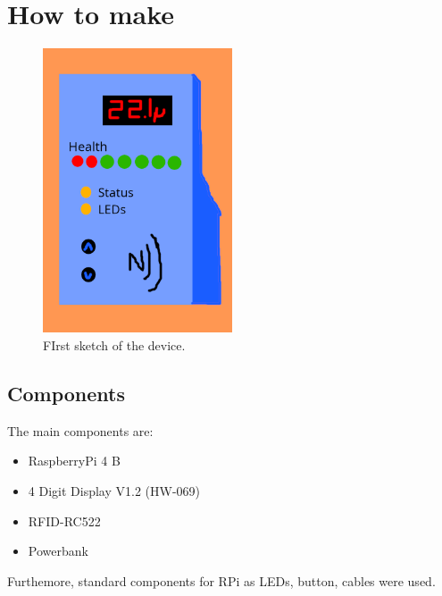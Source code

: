 \documentclass{article}
\begin{document}
\section{How to make}

\begin{figure}
    \centering
    \includegraphics[width=0.5\textwidth]{imgs/Sketch.png}
    \caption{FIrst sketch of the device.}
\end{figure}

\subsection{Components}
The main components are:
\begin{itemize}
    \item RaspberryPi 4 B
    \item 4 Digit Display V1.2 (HW-069) 
    \item RFID-RC522
    \item Powerbank
\end{itemize}
Furthemore, standard components for RPi as LEDs, button, cables were used.
\end{document}
